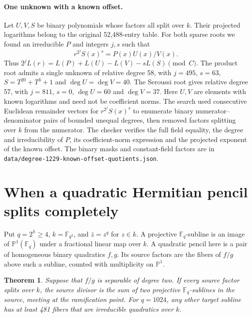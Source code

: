 \documentclass[11pt]{article}
\newtheorem{theorem}{Theorem}
\begin{document}
\paragraph{One unknown with a known offset.}
Let \(U,V,S\) be binary polynomials whose factors all split over \(k\).
Their projected logarithms belong to the original 52,488-entry table.
For both sparse roots we found an irreducible \(P\) and integers \(j,s\)
such that
\[
 r^{2^j}S(x)^s=P(x)U(x)/V(x).
\]
Thus \(2^j L(r)=L(P)+L(U)-L(V)-sL(S)\pmod C\).
The product root admits a single unknown of relative degree 58, with
\(j=495\), \(s=63\), \(S=T^{20}+T^3+1\) and
\(\deg U=\deg V=40\). The Seroussi root gives relative degree 57,
with \(j=811\), \(s=0\), \(\deg U=60\) and \(\deg V=37\).
Here \(U,V\) are elements with known logarithms and need not be
coefficient norms. The search used consecutive Euclidean remainder
vectors for \(r^{2^j}S(x)^s\) to enumerate binary numerator--denominator
pairs of bounded unequal degrees, then removed factors splitting over
\(k\) from the numerator. The checker verifies the full field equality,
the degree and irreducibility of \(P\), its coefficient-norm expression
and the projected exponent of the known offset. The binary masks and
constant-field factors are in \nolinkurl{data/degree-1229-known-offset-quotients.json}.

\section{When a quadratic Hermitian pencil splits completely}
\label{sec:split-quadratic-pencils}
Put \(q=2^h\ge4\), \(k=\mathbb F_{q^2}\), and
\(\bar z=z^q\) for \(z\in k\). A projective \(\mathbb F_q\)-subline
is an image of \(\mathbb P^1(\mathbb F_q)\) under a fractional linear
map over \(k\). A quadratic pencil here is a pair of homogeneous
binary quadratics \(f,g\). Its source factors are the fibers of
\(f/g\) above such a subline, counted with multiplicity on
\(\mathbb P^1\).

\begin{theorem}
Suppose that \(f/g\) is separable of degree two. If every source factor
splits over \(k\), the source divisor is the sum of two projective
\(\mathbb F_q\)-sublines in the source, meeting at the ramification
point. For \(q=1024\), any other target subline has at least 481 fibers
that are irreducible quadratics over \(k\).
\end{theorem}
\end{document}
